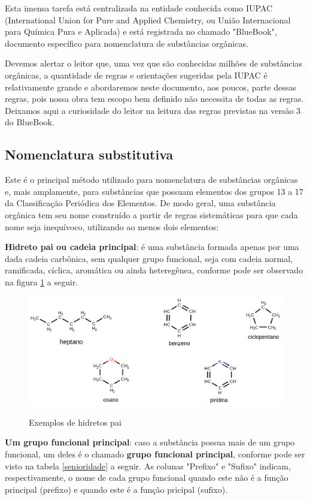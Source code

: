 Esta imensa tarefa está centralizada na entidade conhecida como IUPAC (International Union for Pure and Applied Chemistry, ou União Internacional para Química Pura e Aplicada) e está registrada no chamado "BlueBook", documento específico para nomenclatura de substâncias orgânicas.

Devemos alertar o leitor que, uma vez que são conhecidas milhões de substâncias orgânicas, a quantidade de regras e orientações sugeridas pela IUPAC é relativamente grande e abordaremos neste documento, aos poucos, parte dessas regras, pois nossa obra tem escopo bem definido não necessita de todas as regras. Deixamos aqui a curiosidade do leitor na leitura das regras previstas na versão 3 do BlueBook.

\subsection{Nomenclatura substitutiva}
Este é o principal método utilizado para nomenclatura de substâncias orgânicas e, mais amplamente, para substâncias que possuam elementos dos grupos 13 a 17 da Classificação Periódica dos Elementos. De modo geral, uma substância orgânica tem seu nome construído a partir de regras sistemáticas para que cada nome seja inequívoco, utilizando ao menos dois elementos:

\begin{description}
	\item \textbf{Hidreto pai ou cadeia principal}: é uma substância formada apenas por uma dada cadeia carbônica, sem qualquer grupo funcional, seja com cadeia normal, ramificada, cíclica, aromática ou ainda heteregênea, conforme pode ser observado na figura \ref{fig:hp} a seguir.
	
	\begin{figure}[H]
		\centering
		\caption{Exemplos de hidretos pai}
		\vspace{0.5cm}
		\includegraphics[width=1\linewidth]{imagens/hidretos_pai.png}
	\label{fig:hp}
	\end{figure}

	\item \textbf{Um grupo funcional principal}: caso a substância possua mais de um grupo funcional, um deles é o chamado \textbf{grupo funcional principal}, conforme pode ser visto na tabela \ref{senioridade} a seguir. As colunas "Prefixo" e "Sufixo" indicam, respectivamente, o nome de cada grupo funcional quando este não é a função principal (prefixo) e quando este é a função pricipal (sufixo).
\end{description}

